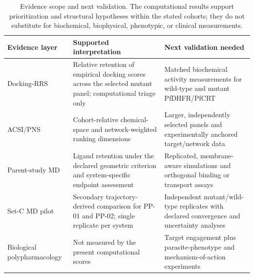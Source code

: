 \begin{table}[htbp]
\centering
\scriptsize
\caption{Evidence scope and next validation. The computational results support prioritization and structural hypotheses within the stated cohorts; they do not substitute for biochemical, biophysical, phenotypic, or clinical measurements.}
\label{tab:s13_evidence_scope}
\begin{tabularx}{\textwidth}{>{\raggedright\arraybackslash}p{} >{\raggedright\arraybackslash}p{} >{\raggedright\arraybackslash}X}
\toprule
Evidence layer & Supported interpretation & Next validation needed \\
\midrule
Docking-RRS & Relative retention of empirical docking scores across the selected mutant panel; computational triage only & Matched biochemical activity measurements for wild-type and mutant PfDHFR/PfCRT \\
ACSI/PNS & Cohort-relative chemical-space and network-weighted ranking dimensions & Larger, independently selected panels and experimentally anchored target/network data \\
Parent-study MD & Ligand retention under the declared geometric criterion and system-specific endpoint assessment & Replicated, membrane-aware simulations and orthogonal binding or transport assays \\
Set-C MD pilot & Secondary trajectory-derived comparison for PP-01 and PP-02; single replicate per system & Independent mutant/wild-type replicates with declared convergence and uncertainty analyses \\
Biological polypharmacology & Not measured by the present computational scores & Target engagement plus parasite-phenotype and mechanism-of-action experiments \\
\bottomrule
\end{tabularx}
\end{table}
